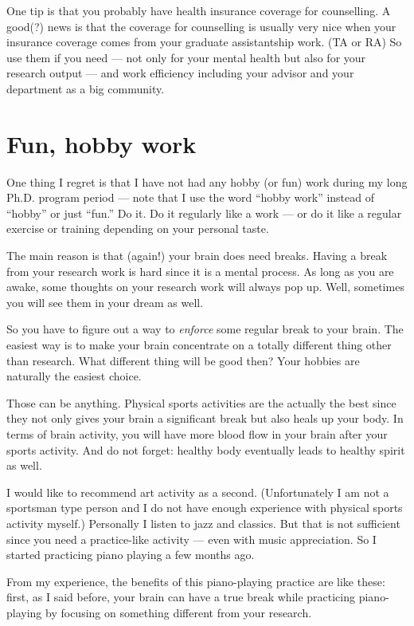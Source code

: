\documentclass[11pt]{article}
\begin{document}
One tip is that you probably have health insurance coverage for counselling. A
good(?) news is that the coverage for counselling is usually very nice when
your insurance coverage comes from your graduate assistantship work. (TA or
RA) So use them if you need --- not only for your mental health but also for
your research output --- and work efficiency including your advisor and
your department as a big community.

\section{Fun, hobby work}

One thing I regret is that I have not had any hobby (or fun) work during my
long Ph.D. program period --- note that I use the word ``hobby work'' instead
of ``hobby'' or just ``fun.'' Do it. Do it regularly like a work --- or do it
like a regular exercise or training depending on your personal taste.

The main reason is that (again!) your brain does need breaks. Having a break
from your research work is hard since it is a mental process. As long as you
are awake, some thoughts on your research work will always pop up. Well,
sometimes you will see them in your dream as well. 

So you have to figure out a way to \emph{enforce} some regular break to your
brain. The easiest way is to make your brain concentrate on a totally
different thing other than research.  What different thing will be good then?
Your hobbies are naturally the easiest choice. 

Those can be anything. Physical sports activities are the actually the best
since they not only gives your brain a significant break but also heals up
your body. In terms of brain activity, you will have more blood flow in your
brain after your sports activity. And do not forget: healthy body eventually
leads to healthy spirit as well. 

I would like to recommend art activity as a second. (Unfortunately I am not a
sportsman type person and I do not have enough experience with physical sports
activity myself.) Personally I listen to jazz and classics. But that is not
sufficient since you need a practice-like activity --- even with music
appreciation. So I started practicing piano playing a few months ago. 

From my experience, the benefits of this piano-playing practice are like
these: first, as I said before, your brain can have a true break while
practicing piano-playing by focusing on something different from your
research.
\end{document}
